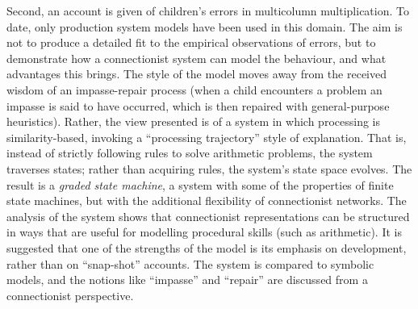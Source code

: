 Second, an account is given of children's errors in multicolumn
multiplication. To date, only production system models have been used in
this domain. The aim is not to produce a detailed fit to the
empirical observations of errors, but to demonstrate how a connectionist
system can model the behaviour, and what advantages this brings. The style
of the model moves away from the received wisdom of an impasse-repair
process (when a child encounters a problem an impasse is said to have
occurred, which is then repaired with general-purpose heuristics).  Rather,
the view presented is of a system in which processing is similarity-based,
invoking a ``processing trajectory'' style of explanation. That is,
instead of strictly following rules to solve arithmetic problems, the
system traverses states; rather than acquiring rules, the system's state
space evolves.  The result is a {\em graded state machine}, a system with
some of the properties of finite state machines, but with the additional
flexibility of connectionist networks.  The analysis of the system shows
that connectionist representations can be structured in ways that are
useful for modelling procedural skills (such as arithmetic). It is
suggested that
one of the strengths of the model is its emphasis on development, rather
than on ``snap-shot'' accounts. The system is compared to symbolic models,
and the notions like ``impasse'' and ``repair'' are discussed
from a connectionist perspective.


